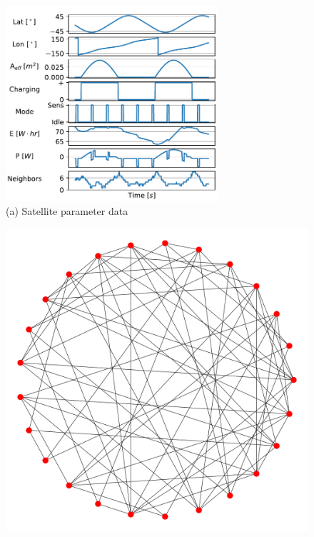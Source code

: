 \documentclass[conference]{IEEEtran}
\begin{document}
\begin{figure}[t]
  \begin{minipage}[b]{\linewidth}
    \begin{center}
      \includegraphics[width=0.7\textwidth]{images/param_plot.pdf} \\
      {\footnotesize(a) Satellite parameter data}
    \end{center}
    \medskip
  \end{minipage}
  \begin{minipage}[b]{0.49\linewidth}
    \begin{center}
      \includegraphics[width=\textwidth]{images/unweighted_plot.pdf} \\

\end{center}
\end{minipage}
\end{figure}
\end{document}
